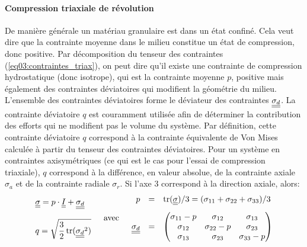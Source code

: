 			\paragraph{Compression triaxiale de révolution\\}\label{para03:triax}
				De manière générale un matériau granulaire est dans un état confiné. Cela veut dire que la contrainte moyenne dans le milieu constitue un état de compression, donc positive. Par décomposition du tenseur des contraintes (\ref{eq03:contraintes_triax}), on peut dire qu'il existe une contrainte de compression hydrostatique (donc isotrope), qui est la contrainte moyenne $p$, positive mais également des contraintes déviatoires qui modifient la géométrie du milieu. L'ensemble des contraintes déviatoires forme le déviateur des contraintes $\underline{\underline{\sigma_d}}$. La contrainte déviatoire $q$ est couramment utilisée afin de déterminer la contribution des efforts qui ne modifient pas le volume du système. Par définition, cette contrainte déviatoire $q$ correspond à la contrainte équivalente de Von Mises calculée à partir du tenseur des contraintes déviatoires. Pour un système en contraintes axisymétriques (ce qui est le cas pour l'essai de compression triaxiale), $q$ correspond à la différence, en valeur absolue, de la contrainte axiale $\sigma_a$ et de la contrainte radiale $\sigma_r$. Si l'axe $3$ correspond à la direction axiale, alors:
				\begin{equation}\label{eq03:contraintes_triax}
					\begin{array}{l}
						\doubleunderline{\sigma} = p\cdot\doubleunderline{I} + \doubleunderline{\sigma_d}\\
						\\
						q = \sqrt{\cfrac{3}{2}\;\mathrm{tr}(\doubleunderline{\sigma_d}^2)}
					\end{array}
					\quad\text{avec}\quad\begin{array}{rcl}
					p & = & \text{tr}(\doubleunderline{\sigma})/3\vspace{0.3cm} = (\sigma_{11}+\sigma_{22}+\sigma_{33})/3\\
					\doubleunderline{\sigma_d} & = &
					\begin{pmatrix}
						\sigma_{11}-p & \sigma_{12} & \sigma_{13} \\
						\sigma_{12} & \sigma_{22}-p & \sigma_{23} \\
						\sigma_{13} & \sigma_{23} & \sigma_{33}-p \\
					\end{pmatrix}\end{array}
				\end{equation}
